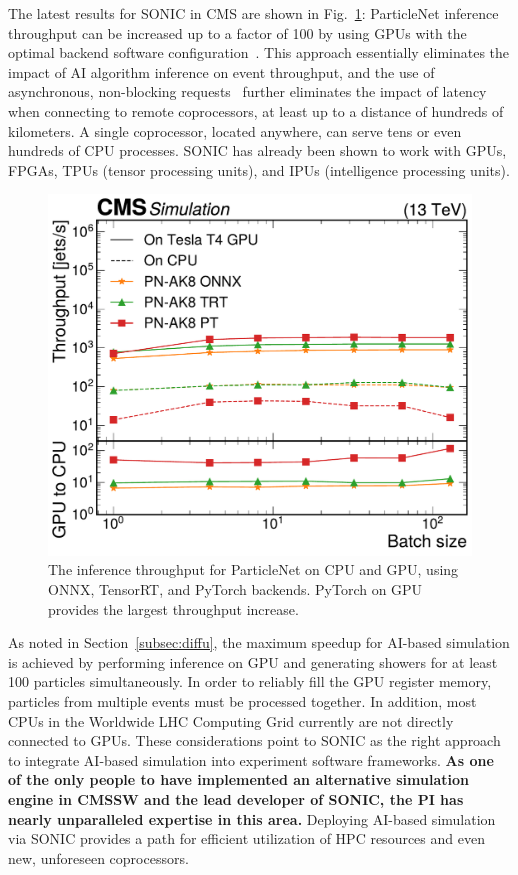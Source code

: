 The latest results for SONIC in CMS are shown in Fig.~\ref{fig:sonic}:
ParticleNet inference throughput can be increased up to a factor of 100 by using GPUs with the optimal backend software configuration~\cite{CMS:2024twn}.
This approach essentially eliminates the impact of AI algorithm inference on event throughput,
and the use of asynchronous, non-blocking requests~\cite{Bocci:2020olh} further eliminates the impact of latency when connecting to remote coprocessors,
at least up to a distance of hundreds of kilometers.
A single coprocessor, located anywhere, can serve tens or even hundreds of CPU processes.
SONIC has already been shown to work with GPUs, FPGAs, TPUs (tensor processing units), and IPUs (intelligence processing units).

\begin{figure}
\centering
\includegraphics[width=0.49\myfigurewidth]{figures/CMS-MLG-23-001_Figure_005-b.pdf}
\caption{The inference throughput for ParticleNet on CPU and GPU, using ONNX, TensorRT, and PyTorch backends. PyTorch on GPU provides the largest throughput increase.}
\label{fig:sonic}
\end{figure}

As noted in Section~\ref{subsec:diffu}, the maximum speedup for AI-based simulation is achieved by performing inference on GPU
and generating showers for at least 100 particles simultaneously.
In order to reliably fill the GPU register memory, particles from multiple events must be processed together.
In addition, most CPUs in the Worldwide LHC Computing Grid currently are not directly connected to GPUs.
These considerations point to SONIC as the right approach to integrate AI-based simulation into experiment software frameworks.
\textbf{As one of the only people to have implemented an alternative simulation engine in CMSSW
and the lead developer of SONIC, the PI has nearly unparalleled expertise in this area.}
Deploying AI-based simulation via SONIC provides a path for efficient utilization of HPC resources and even new, unforeseen coprocessors.

